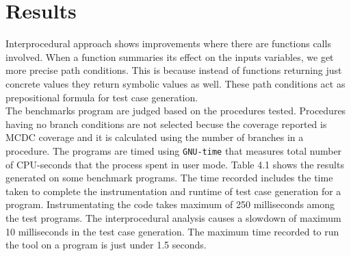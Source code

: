 \documentclass[12pt,oneside]{book}
\begin{document}
\section{Results}
Interprocedural approach shows improvements where there are functions calls involved. When a function summaries its effect on the inputs variables, we get more precise path conditions. This is because instead of functions returning just concrete values they return symbolic values as well. These path conditions act as prepositional formula for test case generation. \\
The benchmarks program are judged based on the procedures tested. Procedures having no branch conditions are not selected becuse the coverage reported is MCDC coverage\cite{mcdc} and it is calculated using the number of branches in a procedure. The programs are timed using \texttt{GNU-time}\cite{time} that measures total number of CPU-seconds that the process spent in user mode. Table 4.1 shows the results generated on some benchmark programs. The time recorded includes the time taken to complete the instrumentation and runtime of test case generation for a program. Instrumentating the code takes maximum of 250 milliseconds among the test programs. The interprocedural analysis causes a slowdown of maximum 10 milliseconds in the test case generation. The maximum time recorded to run the tool on a program is just under 1.5 seconds.
\\
\end{document}
